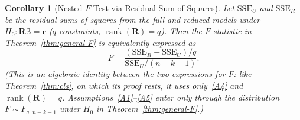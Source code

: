 \documentclass[14pt]{extarticle}
\theoremstyle{plain}
\newtheorem{corollary}[theorem]{Corollary}
\theoremstyle{definition}
\theoremstyle{remark}
\DeclareMathOperator\rank{rank}
\newcommand{\SSE}{\mathrm{SSE}}
\def\bb{\boldsymbol{\beta}}
\newcommand{\bR}{\mathbf{R}}
\newcommand{\br}{\mathbf{r}}
\begin{document}
\begin{corollary}[Nested $F$ Test via Residual Sum of Squares]\label{cor:nested-F}
Let $\SSE_U$ and $\SSE_R$ be the residual sums of squares from the full and reduced models under $H_0\colon \bR\bb = \br$ ($q$ constraints, $\rank(\bR) = q$). Then the $F$ statistic in Theorem~\ref{thm:general-F} is equivalently expressed as
\begin{equation}
F = \frac{(\SSE_R - \SSE_U)/q}{\SSE_U/(n-k-1)}.
\end{equation}
(This is an algebraic identity between the two expressions for $F$: like Theorem~\ref{thm:cls}, on which its proof rests, it uses only~\ref{A4} and $\rank(\bR) = q$. Assumptions~\ref{A1}--\ref{A5} enter only through the distribution $F \sim F_{q,\, n-k-1}$ under $H_0$ in Theorem~\ref{thm:general-F}.)
\end{corollary}
\end{document}

